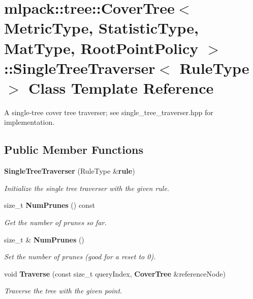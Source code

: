 \section{mlpack\+:\+:tree\+:\+:Cover\+Tree$<$ Metric\+Type, Statistic\+Type, Mat\+Type, Root\+Point\+Policy $>$\+:\+:Single\+Tree\+Traverser$<$ Rule\+Type $>$ Class Template Reference}
\label{classmlpack_1_1tree_1_1CoverTree_1_1SingleTreeTraverser}


A single-\/tree cover tree traverser; see single\+\_\+tree\+\_\+traverser.\+hpp for implementation.  


\subsection*{Public Member Functions}
\begin{DoxyCompactItemize}
\item 
{\bf Single\+Tree\+Traverser} (Rule\+Type \&{\bf rule})
\begin{DoxyCompactList}\small\item\em Initialize the single tree traverser with the given rule. \end{DoxyCompactList}\item 
size\+\_\+t {\bf Num\+Prunes} () const 
\begin{DoxyCompactList}\small\item\em Get the number of prunes so far. \end{DoxyCompactList}\item 
size\+\_\+t \& {\bf Num\+Prunes} ()
\begin{DoxyCompactList}\small\item\em Set the number of prunes (good for a reset to 0). \end{DoxyCompactList}\item 
void {\bf Traverse} (const size\+\_\+t query\+Index, {\bf Cover\+Tree} \&reference\+Node)
\begin{DoxyCompactList}\small\item\em Traverse the tree with the given point. \end{DoxyCompactList}\end{DoxyCompactItemize}

